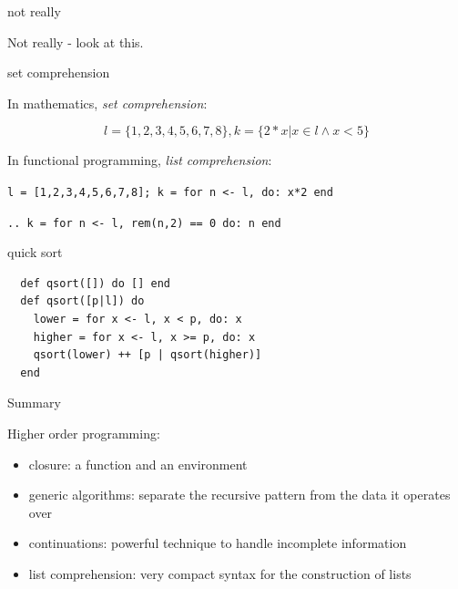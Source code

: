 \begin{frame}{not really}

\vspace{40pt}Not really - look at this.

\end{frame}

\begin{frame}{set comprehension}

In mathematics, {\em set comprehension}:

$$l = \lbrace 1,2,3,4,5,6,7,8 \rbrace ,  k = \lbrace 2*x | x \in l \wedge x < 5 \rbrace$$

\pause In functional programming, {\em list comprehension}:

\pause 
\vspace{20pt}\hspace{40pt} {\tt l = [1,2,3,4,5,6,7,8]; k = for n <- l, do: x*2 end}

\pause 
\vspace{20pt}\hspace{40pt} {\tt .. k = for n <- l, rem(n,2) == 0 do: n end}
\end{frame}


\begin{frame}[fragile]{quick sort}

\begin{verbatim}
  def qsort([]) do [] end
  def qsort([p|l]) do
    lower = for x <- l, x < p, do: x 
    higher = for x <- l, x >= p, do: x 
    qsort(lower) ++ [p | qsort(higher)]
  end
\end{verbatim}


\end{frame}


\begin{frame}{Summary}

\pause Higher order programming:

\begin{itemize}
\pause\item {closure}: a function and an environment
\pause\item {generic algorithms}: separate the recursive pattern from the data it operates over
\pause\item {continuations}: powerful technique to handle incomplete information
\pause\item {list comprehension}: very compact syntax for the construction of lists
\end{itemize}


\end{frame}






